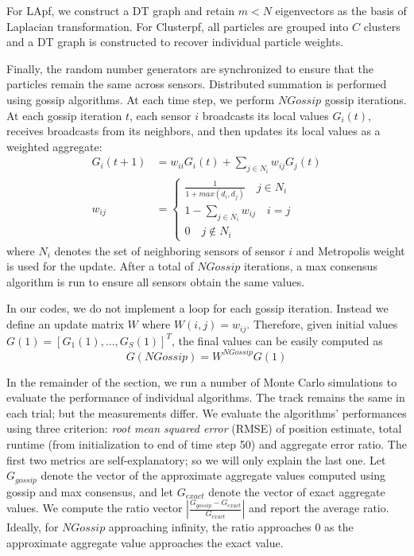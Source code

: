 \documentclass[10pt,letterpaper,final]{article}
\begin{document}
For LApf, we construct a DT graph and retain $m< N$ eigenvectors as the basis of Laplacian transformation. For Clusterpf, all particles are grouped into $C$ clusters and a DT graph is constructed to recover individual particle weights. 

Finally, the random number generators are synchronized to ensure that the particles remain the same across sensors. Distributed summation is performed using gossip algorithms. At each time step, we perform $NGossip$ gossip iterations. At each gossip iteration $t$, each sensor $i$ broadcasts its local values $G_i(t)$, receives broadcasts from its neighbors, and then updates its local values as a weighted aggregate:
\begin{align}
G_i(t+1) &= w_{ii}G_i(t) + \sum_{j\in N_i}w_{ij}G_j(t) \\
w_{ij} &=
\begin{cases}
\frac{1}{1+max(d_i, d_j)} \quad j\in N_i \\
1-\sum_{j\in N_i}w_{ij} \quad i=j \\
0 \quad j\notin N_i
\end{cases}
\label{eqn:metropolis_weight}
\end{align}
where $N_i$ denotes the set of neighboring sensors of sensor $i$ and Metropolis weight is used for the update. After a total of $NGossip$ iterations, a max consensus algorithm is run to ensure all sensors obtain the same values. 

In our codes, we do not implement a loop for each gossip iteration. Instead we define an update matrix $W$ where $W(i,j)=w_{ij}$. Therefore, given initial values $G(1)=[G_1(1),...,G_S(1)]^T$, the final values can be easily computed as 
\begin{equation}
G(NGossip) = W^{NGossip}G(1)
\end{equation}

In the remainder of the section, we run a number of Monte Carlo simulations to evaluate the performance of individual algorithms. The track remains the same in each trial; but the measurements differ. We evaluate the algorithms' performances using three criterion: \textit{root mean squared error} (RMSE) of position estimate, total runtime (from initialization to end of time step 50) and aggregate error ratio. The first two metrics are self-explanatory; so we will only explain the last one. Let $G_{gossip}$ denote the vector of the approximate aggregate values computed using gossip and max consensus, and let $G_{exact}$ denote the vector of exact aggregate values. We compute the ratio vector $|\frac{G_{gossip}-G_{exact}}{G_{exact}}|$ and report the average ratio. Ideally, for $NGossip$ approaching infinity, the ratio approaches 0 as the approximate aggregate value approaches the exact value. 
\end{document}
